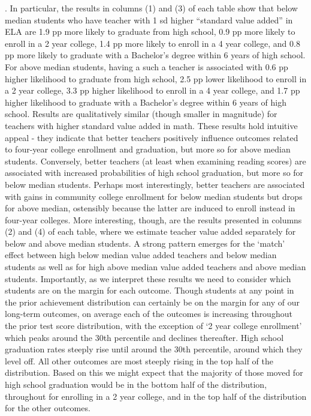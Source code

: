 \documentclass{article}
\theoremstyle{definition}
\theoremstyle{definition}
\theoremstyle{definition}
\theoremstyle{definition}
\begin{document}
. In particular, the results in columns (1) and (3) of each table show that below median students who have teacher with 1 sd higher “standard value added” in ELA are 1.9 pp more likely to graduate from high school, 0.9 pp more likely to enroll in a 2 year college, 1.4 pp more likely to enroll in a 4 year college, and 0.8 pp more likely to graduate with a Bachelor's degree within 6 years of high school. For above median students, having a such a teacher is associated with 0.6 pp higher likelihood to graduate from high school, 2.5 pp lower likelihood to enroll in a 2 year college, 3.3 pp higher likelihood to enroll in a 4 year college, and 1.7 pp higher likelihood to graduate with a Bachelor's degree within 6 years of high school. Results are qualitatively similar (though smaller in magnitude) for teachers with higher standard value added in math. These results hold intuitive appeal - they indicate that better teachers positively influence outcomes related to four-year college enrollment and graduation, but more so for above median students.  Conversely, better teachers (at least when examining reading scores) are associated with increased probabilities of high school graduation, but more so for below median students.  Perhaps most interestingly, better teachers are associated with gains in community college enrollment for below median students but drops for above median, ostensibly because the latter are induced to enroll instead in four-year colleges.  
More interesting, though, are the results presented in columns (2) and (4) of each table, where we estimate teacher value added separately for below and above median students. A strong pattern emerges for the `match' effect between high below median value added teachers and below median students as well as for high above median value added teachers and above median students. Importantly, as we interpret these results we need to consider which students are on the margin for each outcome. Though students at any point in the prior achievement distribution can certainly be on the margin for any of our long-term outcomes, on average each of the outcomes is increasing throughout the prior test score distribution, with the exception of `2 year college enrollment' which peaks around the 30th percentile and declines thereafter. High school graduation rates steeply rise until around the 30th percentile, around which they level off. All other outcomes are most steeply rising in the top half of the distribution. Based on this we might expect that the majority of those moved for high school graduation would be in the bottom half of the distribution, throughout for enrolling in a 2 year college, and in the top half of the distribution for the other outcomes.
\end{document}
